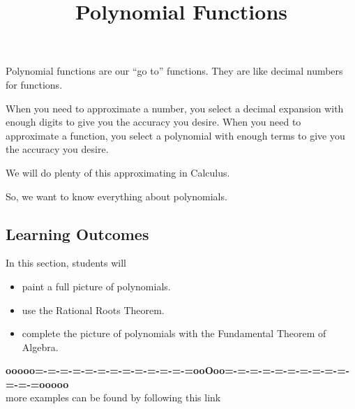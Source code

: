 \documentclass{ximera}
\title{Polynomial Functions}
\begin{document}
\begin{abstract}
\end{abstract}
\maketitle






Polynomial functions are our ``go to'' functions.  They are like decimal numbers for functions.  

When you need to approximate a number, you select a decimal expansion with enough digits to give you the accuracy you desire. When you need to approximate a function, you select a polynomial with enough terms to give you the accuracy you desire. 

We will do plenty of this approximating in Calculus.

So, we want to know everything about polynomials.
















\subsection{Learning Outcomes}

\begin{sectionOutcomes}
In this section, students will 

\begin{itemize}
\item paint a full picture of polynomials.
\item use the Rational Roots Theorem.
\item complete the picture of polynomials with the Fundamental Theorem of Algebra.
\end{itemize}
\end{sectionOutcomes}










\begin{center}
\textbf{\textcolor{green!50!black}{ooooo=-=-=-=-=-=-=-=-=-=-=-=-=ooOoo=-=-=-=-=-=-=-=-=-=-=-=-=ooooo}} \\

more examples can be found by following this link\\ 

\end{center}
\end{document}
